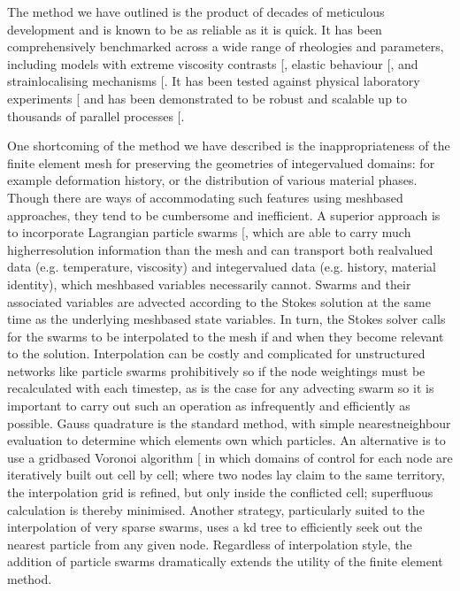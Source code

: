 \documentclass[letterpaper,10pt,english]{jupyterBook}
\begin{document}
\sphinxAtStartPar
The method we have outlined is the product of decades of meticulous development and is known to be as reliable as it is quick. It has been comprehensively benchmarked across a wide range of rheologies and parameters, including models with extreme viscosity contrasts {[}\sphinxcite{references:id544}{]}, elastic behaviour {[}\sphinxcite{references:id384}{]}, and strain\sphinxhyphen{}localising mechanisms {[}\sphinxcite{references:id383}{]}. It has been tested against physical laboratory experiments {[}\sphinxcite{references:id67}{]} and has been demonstrated to be robust and scalable up to thousands of parallel processes {[}\sphinxcite{references:id73}{]}.

\sphinxAtStartPar
One shortcoming of the method we have described is the inappropriateness of the finite element mesh for preserving the geometries of integer\sphinxhyphen{}valued domains: for example deformation history, or the distribution of various material phases. Though there are ways of accommodating such features using mesh\sphinxhyphen{}based approaches, they tend to be cumbersome and inefficient. A superior approach is to incorporate Lagrangian particle swarms {[}\sphinxcite{references:id552}{]}, which are able to carry much higher\sphinxhyphen{}resolution information than the mesh and can transport both real\sphinxhyphen{}valued data (e.g. temperature, viscosity) and integer\sphinxhyphen{}valued data (e.g. history, material identity), which mesh\sphinxhyphen{}based variables necessarily cannot. Swarms and their associated variables are advected according to the Stokes solution at the same time as the underlying mesh\sphinxhyphen{}based state variables. In turn, the Stokes solver calls for the swarms to be interpolated to the mesh if and when they become relevant to the solution. Interpolation can be costly and complicated for unstructured networks like particle swarms \sphinxhyphen{} prohibitively so if the node weightings must be recalculated with each timestep, as is the case for any advecting swarm \sphinxhyphen{} so it is important to carry out such an operation as infrequently and efficiently as possible. Gauss quadrature is the standard method, with simple nearest\sphinxhyphen{}neighbour evaluation to determine which elements own which particles. An alternative is to use a grid\sphinxhyphen{}based Voronoi algorithm {[}\sphinxcite{references:id65}{]} in which domains of control for each node are iteratively built out cell by cell; where two nodes lay claim to the same territory, the interpolation grid is refined, but only inside the conflicted cell; superfluous calculation is thereby minimised. Another strategy, particularly suited to the interpolation of very sparse swarms, uses a k\sphinxhyphen{}d tree to efficiently seek out the nearest particle from any given node. Regardless of interpolation style, the addition of particle swarms dramatically extends the utility of the finite element method.
\end{document}
